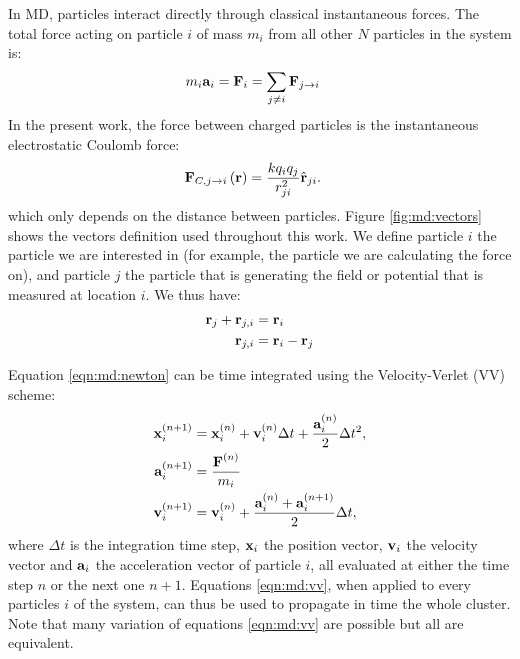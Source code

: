 In MD, particles interact directly through classical instantaneous forces. The
total force acting on particle $i$ of mass $m_i$ from all other $N$ particles in
the system is:
\begin{align}
m_i \textbf{a}_i & = \textbf{F}_i = \sum_{j \ne i} \textbf{F}_{j \rightarrow i}
\label{eqn:md:newton}
\end{align}
In the present work, the force between charged particles is the instantaneous
electrostatic Coulomb force:
\begin{align}
\textbf{F}_{C,j \rightarrow i}\left( \textbf{r} \right) & =\frac{k q_i q_j}{r_{ji}^2} \hat{\textbf{r}}_{ji}.
\label{eqn:md:coulomb:F}
\end{align}
which only depends on the distance between particles. Figure
\ref{fig:md:vectors} shows the vectors definition used throughout this work. We
define particle $i$ the particle we are interested in (for example, the
particle we are calculating the force on), and particle $j$ the particle that
is generating the field or potential that is measured at location $i$. We thus
have:
\begin{align}
\textbf{r}_{j} + \textbf{r}_{j,i} & = \textbf{r}_{i} \\
\textbf{r}_{j,i} & = \textbf{r}_{i} - \textbf{r}_{j}
\end{align}



Equation \eqref{eqn:md:newton} can be time integrated using the
Velocity-Verlet (VV) scheme:
\begin{subequations}
\begin{align}
\textbf{x}_{i}^{\left( n+1 \right)} & = \textbf{x}_{i}^{\left( n \right)} + \textbf{v}_{i}^{\left( n \right)} \Delta t +
\frac{\textbf{a}_{i}^{\left( n \right)}}{2} \Delta t^2, \\
\textbf{a}_{i}^{\left( n+1 \right)} & = \frac{\textbf{F}^{\left( n \right)}}{m_i} \label{eqn:md:vv:a} \\
\textbf{v}_{i}^{\left( n+1 \right)} & = \textbf{v}_{i}^{\left( n \right)} + \frac{\textbf{a}_{i}^{\left( n \right)} +
\textbf{a}_{i}^{\left( n+1 \right)}}{2} \Delta t,
\end{align}
\label{eqn:md:vv}
\end{subequations}
where $\Delta t$ is the integration time step, $\textbf{x}_{i}$ the position vector,
$\textbf{v}_{i}$ the velocity vector and $\textbf{a}_{i}$ the acceleration vector of
particle $i$, all evaluated at either the time step $n$ or the next one $n+1$.
Equations \eqref{eqn:md:vv}, when applied to every particles $i$ of the system,
can thus be used to propagate in time the whole cluster. Note that many
variation of equations \eqref{eqn:md:vv} are possible but all are equivalent.

